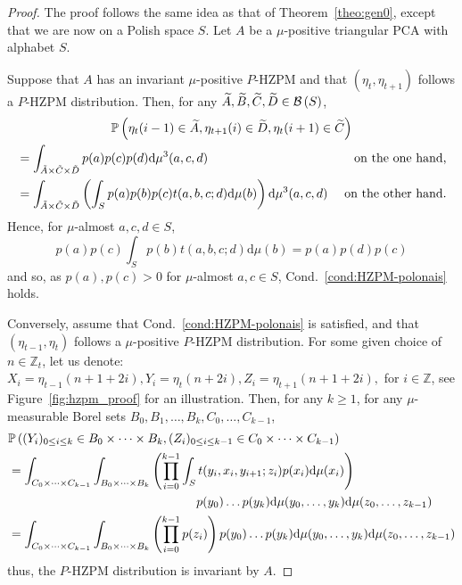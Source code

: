 \documentclass[10pt]{amsart}
\theoremstyle{definition}\newtheorem{defi}[theo]{Definition}\newtheorem{rema}[theo]{Remark}\newtheorem{exam}[theo]{Example}\newtheorem{exem}[theo]{Example}\newtheorem{nota}[theo]{Notation}
\let\oldtilde\tilde
\renewcommand*{\tilde}[1]{\mathchoice{\widetilde{#1}}{\widetilde{#1}}{\oldtilde{#1}}{\oldtilde{#1}}}
\newcounter{a}
\newcommand{\Cond}{Cond.}
\newcommand{\diff}[1]{\mathrm{d} #1}
\newcommand{\borel}[1]{\mathcal{B}\left(#1 \right)}
\newcommand{\Z}{\mathbb{Z}}
\newcommand{\Pbb}{\mathbb{P}}
\begin{document}
\begin{proof}
The proof follows the same idea as that of Theorem~\ref{theo:gen0}, except that we are now on a Polish space $S$. Let $A$ be a $\mu$-positive triangular PCA with alphabet $S$.

Suppose that $A$ has an invariant $\mu$-positive $P$-HZPM and that $(\eta_t,\eta_{t+1})$ follows a $P$-HZPM distribution. Then, for any $\tilde A,\tilde B, \tilde C,\tilde D \in \borel{S}$,
\begin{multline*}
\Pbb\left(\eta_t(i-1) \in \tilde A, \eta_{t+1}(i) \in \tilde D, \eta_t(i+1) \in \tilde C\right) \\
\begin{aligned}
& = \int_{\tilde A \times \tilde C \times \tilde D} p(a) p(c) p(d) \diff{\mu^3(a,c,d)} & \text{ on the one hand,}\\
& = \int_{\tilde A \times \tilde C \times \tilde D} \left(\int_S p(a) p(b) p(c) t(a,b,c;d) \diff{\mu(b)} \right) \diff{\mu^3(a,c,d)} & \text{ on the other hand.}
\end{aligned}
\end{multline*}
Hence, for $\mu$-almost $a,c,d \in S$,
\[
p(a) p(c) \int_S p(b) t(a,b,c;d) \diff{\mu(b)} = p(a) p(d) p(c)
\]
and so, as $p(a),p(c) > 0$ for $\mu$-almost $a,c\in S$, \Cond~\ref{cond:HZPM-polonais} holds.


Conversely, assume that \Cond~\ref{cond:HZPM-polonais} is satisfied, and that $(\eta_{t-1},\eta_t)$ follows a $\mu$-positive $P$-HZPM distribution. For some given choice of $n\in\Z_{t}$, let us denote: $X_i=\eta_{t-1}(n+1+2i), Y_i=\eta_{t}(n+2i), Z_i=\eta_{t+1}(n+1+2i),$ for $i\in \Z$, see Figure~\ref{fig:hzpm_proof} for an illustration. Then, for any $k\geq 1$, for any $\mu$-measurable Borel sets $B_0,B_1,\dots,B_k, C_0,\dots,C_{k-1}$,
\begin{align*}
& \Pbb\left((Y_i)_{0 \leq i \leq k} \in B_0\times \cdots \times B_k, (Z_i)_{0 \leq i \leq k-1} \in C_0 \times \cdots \times C_{k-1}\right) \\
& = \int_{C_0 \times \dots \times C_{k-1}} \int_{B_0 \times \dots \times B_{k}} \left(\prod_{i=0}^{k-1} \int_{S} t(y_i,x_{i},y_{i+1};z_i) p(x_{i}) \diff{\mu(x_{i})} \right) \nonumber \\
&\mkern 275mu p(y_0) \dots p(y_{k}) \diff{\mu(y_0,\dots,y_{k})} \diff{\mu(z_0,\dots,z_{k-1})}\\
& = \int_{C_0 \times \dots \times C_{k-1}} \int_{B_0 \times \dots \times B_{k}} \left(\prod_{i=0}^{k-1} p(z_{i}) \right) p(y_0) \dots p(y_{k}) \diff{\mu(y_0,\dots,y_{k})} \diff{\mu(z_0,\dots,z_{k-1})}
\end{align*}
thus, the $P$-HZPM distribution is invariant by $A$.
\end{proof}
\end{document}
